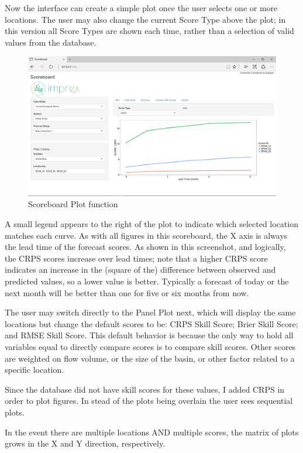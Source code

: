 \documentclass[logos,parttoc,morelanguage=french,morelanguage=german,draft]{orsay-memoire}
\begin{document}
Now the interface can create a simple plot once the user selects one or more locations. The user may also change the current Score Type above the plot; in this version all Score Types are shown each time, rather than a selection of valid values from the database.

\begin{figure}[H]
\centering
\includegraphics[width=0.85\linewidth]{images/isb1.png}
  \caption{Scoreboard Plot function}
  \label{fig:isb1}
\end{figure}

A small legend appears to the right of the plot to indicate which selected location matches each curve. As with all figures in this scoreboard, the X axis is always the lead time of the forecast scores. As shown in this screenshot, and logically, the CRPS scores increase over lead times; note that a higher CRPS score indicates an increase in the (square of the) difference between observed and predicted values, so a lower value is better. Typically a forecast of today or the next month will be better than one for five or six months from now.

The user may switch directly to the Panel Plot next, which will display the same locations but change the default scores to be: CRPS Skill Score; Brier Skill Score; and RMSE Skill Score. This default behavior is because the only way to hold all variables equal to directly compare scores is to compare skill scores. Other scores are weighted on flow volume, or the size of the basin, or other factor related to a specific location.

Since the database did not have skill scores for these values, I added CRPS in order to plot figures. In stead of the plots being overlain the user sees sequential plots.

In the event there are multiple locations AND multiple scores, the matrix of plots grows in the X and Y direction, respectively.
\end{document}
